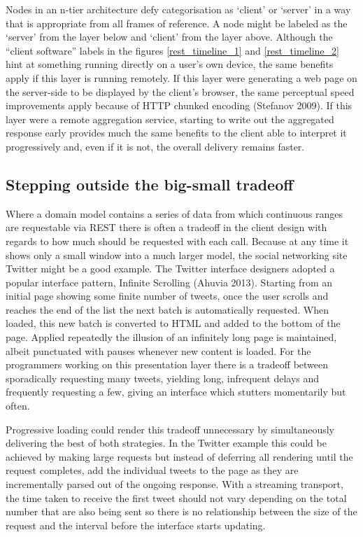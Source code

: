 \documentclass[12pt, ]{article}
\begin{document}
Nodes in an n-tier architecture defy categorisation as `client' or
`server' in a way that is appropriate from all frames of reference. A
node might be labeled as the `server' from the layer below and `client'
from the layer above. Although the ``client software'' labels in the
figures \ref{rest_timeline_1} and \ref{rest_timeline_2} hint at
something running directly on a user's own device, the same benefits
apply if this layer is running remotely. If this layer were generating a
web page on the server-side to be displayed by the client's browser, the
same perceptual speed improvements apply because of HTTP chunked
encoding (Stefanov 2009). If this layer were a remote aggregation
service, starting to write out the aggregated response early provides
much the same benefits to the client able to interpret it progressively
and, even if it is not, the overall delivery remains faster.

\subsection{Stepping outside the big-small
tradeoff}\label{stepping-outside-the-big-small-tradeoff}

Where a domain model contains a series of data from which continuous
ranges are requestable via REST there is often a tradeoff in the client
design with regards to how much should be requested with each call.
Because at any time it shows only a small window into a much larger
model, the social networking site Twitter might be a good example. The
Twitter interface designers adopted a popular interface pattern,
Infinite Scrolling (Ahuvia 2013). Starting from an initial page showing
some finite number of tweets, once the user scrolls and reaches the end
of the list the next batch is automatically requested. When loaded, this
new batch is converted to HTML and added to the bottom of the page.
Applied repeatedly the illusion of an infinitely long page is
maintained, albeit punctuated with pauses whenever new content is
loaded. For the programmers working on this presentation layer there is
a tradeoff between sporadically requesting many tweets, yielding long,
infrequent delays and frequently requesting a few, giving an interface
which stutters momentarily but often.

Progressive loading could render this tradeoff unnecessary by
simultaneously delivering the best of both strategies. In the Twitter
example this could be achieved by making large requests but instead of
deferring all rendering until the request completes, add the individual
tweets to the page as they are incrementally parsed out of the ongoing
response. With a streaming transport, the time taken to receive the
first tweet should not vary depending on the total number that are also
being sent so there is no relationship between the size of the request
and the interval before the interface starts updating.
\end{document}
